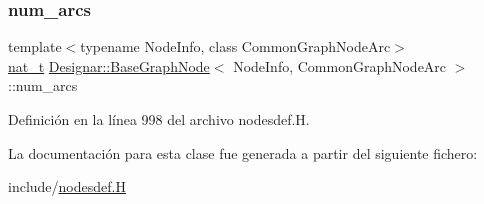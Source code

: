 \mbox{\label{class_designar_1_1_base_graph_node_a035347b8e1ffaca5df73b42bef300e0f}} 
\subsubsection{\texorpdfstring{num\+\_\+arcs}{num\_arcs}}
{\footnotesize\ttfamily template$<$typename Node\+Info, class Common\+Graph\+Node\+Arc$>$ \\
\hyperlink{namespace_designar_aa72662848b9f4815e7bf31a7cf3e33d1}{nat\+\_\+t} \hyperlink{class_designar_1_1_base_graph_node}{Designar\+::\+Base\+Graph\+Node}$<$ Node\+Info, Common\+Graph\+Node\+Arc $>$\+::num\+\_\+arcs\hspace{0.3cm}{\ttfamily [protected]}}



Definición en la línea 998 del archivo nodesdef.\+H.



La documentación para esta clase fue generada a partir del siguiente fichero\+:\begin{DoxyCompactItemize}
\item 
include/\hyperlink{nodesdef_8_h}{nodesdef.\+H}\end{DoxyCompactItemize}
